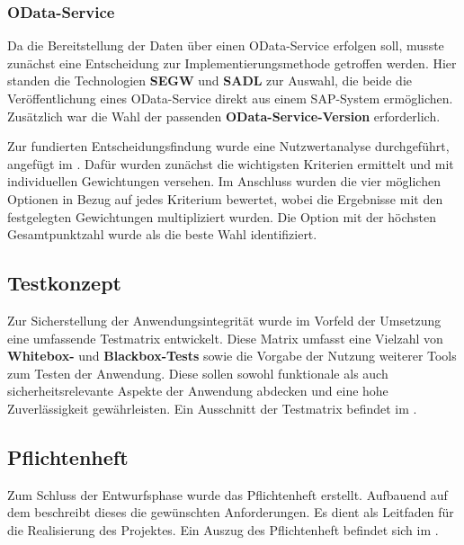 \subsubsection{OData-Service}
\label{sec:OData-Service}
Da die Bereitstellung der Daten über einen OData-Service erfolgen soll, musste zunächst eine Entscheidung zur Implementierungsmethode getroffen werden. Hier standen die Technologien \textbf{SEGW} und \textbf{SADL} zur Auswahl, die beide die Veröffentlichung eines OData-Service direkt aus einem SAP-System ermöglichen. Zusätzlich war die Wahl der passenden \textbf{OData-Service-Version} erforderlich.

Zur fundierten Entscheidungsfindung wurde eine Nutzwertanalyse durchgeführt, angefügt im . Dafür wurden zunächst die wichtigsten Kriterien ermittelt und mit individuellen Gewichtungen versehen. Im Anschluss wurden die vier möglichen Optionen in Bezug auf jedes Kriterium bewertet, wobei die Ergebnisse mit den festgelegten Gewichtungen multipliziert wurden. Die Option mit der höchsten Gesamtpunktzahl wurde als die beste Wahl identifiziert.


\subsection{Testkonzept}
\label{sec:Testkonzept}
Zur Sicherstellung der Anwendungsintegrität wurde im Vorfeld der Umsetzung eine umfassende Testmatrix entwickelt. Diese Matrix umfasst eine Vielzahl von \textbf{Whitebox-} und \textbf{Blackbox-Tests} sowie die Vorgabe der Nutzung weiterer Tools zum Testen der Anwendung. Diese sollen sowohl funktionale als auch sicherheitsrelevante Aspekte der Anwendung abdecken und eine hohe Zuverlässigkeit gewährleisten. Ein Ausschnitt der Testmatrix befindet im .

\subsection{Pflichtenheft}
\label{sec:Pflichtenheft}
Zum Schluss der Entwurfsphase wurde das Pflichtenheft erstellt. Aufbauend auf dem  beschreibt dieses die gewünschten Anforderungen. Es dient als Leitfaden für die Realisierung des Projektes. Ein Auszug des Pflichtenheft befindet sich im .